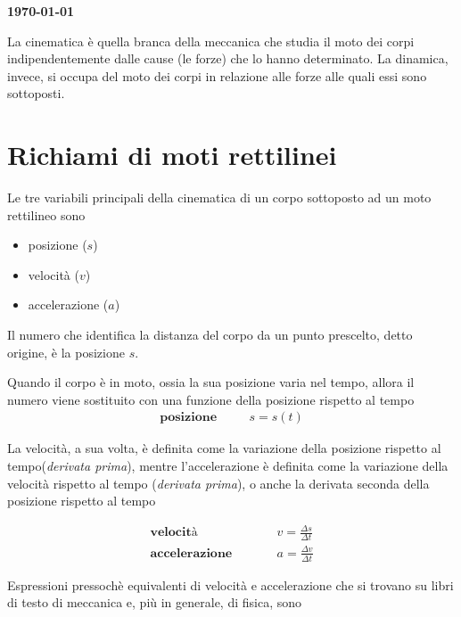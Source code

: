 \documentclass[17pt]{extarticle}
\begin{document}
\printindex

\begin{flushright}
{\bf \today}
\end{flushright}

\tableofcontents

\clearpage

La cinematica è quella branca della meccanica che studia il moto dei corpi indipendentemente dalle cause (le forze) che lo hanno determinato. La dinamica, invece, si occupa del moto dei corpi in relazione alle forze alle quali essi sono sottoposti.


\section{Richiami di moti rettilinei}

Le tre variabili principali della cinematica di un corpo sottoposto ad un moto rettilineo sono
\begin{itemize}
	\item posizione ($s$)
	\item velocità ($v$)
	\item accelerazione ($a$)
\end{itemize}

Il numero che identifica la distanza del corpo da un punto prescelto, detto origine, è la posizione $s$.

Quando il corpo è in moto, ossia la sua posizione varia nel tempo, allora il numero viene sostituito con una funzione della posizione rispetto al tempo 
\begin{eqnarray}
	\textbf{posizione}&\quad & s = s(t)
\end{eqnarray}

La velocità, a sua volta, è definita come la variazione della posizione rispetto al tempo(\emph{derivata prima}), mentre l'accelerazione è definita come la variazione della velocità rispetto al tempo (\emph{derivata prima}), o anche la derivata seconda della posizione rispetto al tempo

\begin{eqnarray}\label{eq:velocita}
	\textbf{velocità}& \qquad & v = \frac{\Delta s}{\Delta t}\\ \label{eq:accelerazione}
	\textbf{accelerazione}& \qquad & a = \frac{\Delta v}{\Delta t}
\end{eqnarray}

Espressioni pressochè equivalenti di velocità e accelerazione che si trovano su libri di testo di meccanica e, più in generale, di fisica, sono
\end{document}
